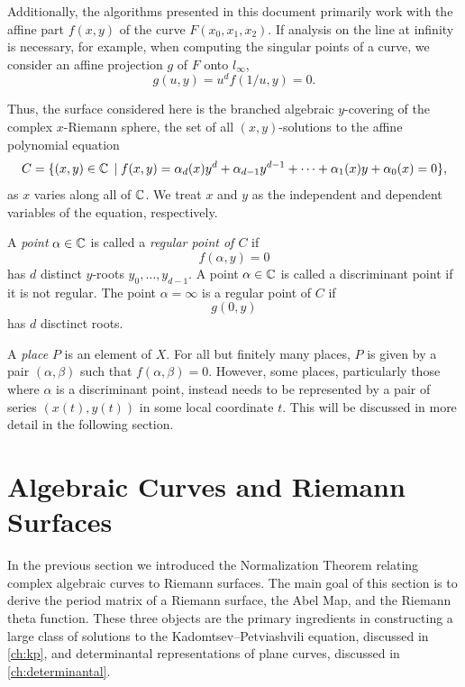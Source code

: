 Additionally, the algorithms presented in this document primarily work with the
affine part $f(x,y)$ of the curve $F(x_0,x_1,x_2)$. If analysis on the line at
infinity is necessary, for example, when computing the singular points of a
curve, we consider an affine projection $g$ of $F$ onto $l_\infty$,
\[
  g(u,y) = u^d f(1/u,y) = 0.
\]

Thus, the surface considered here is the branched algebraic $y$-covering of the
complex $x$-Riemann sphere, the set of all $(x,y)$-solutions to the affine
polynomial equation
\[
    C = \{ (x,y) \in \operatorname{\mathbb{C}} \; | \; f(x,y) = \alpha_d(x)y^d +
    \alpha_{d-1}y^{d-1} + \cdots + \alpha_1(x)y + \alpha_0(x) = 0\},
\]
as $x$ varies along all of $\operatorname{\mathbb{C}}$. We treat $x$ and $y$ as the independent and
dependent variables of the equation, respectively.

A {\it point} $\alpha \in \operatorname{\mathbb{C}}$ is called a {\it regular point of $C$} if
\[
  f(\alpha,y) = 0
\]
has $d$ distinct $y$-roots $y_0,\ldots,y_{d-1}$. A point $\alpha \in \operatorname{\mathbb{C}}$ is
called a discriminant point if it is not regular. The point $\alpha = \infty$ is
a regular point of $C$ if
\[
  g(0,y)
\]
has $d$ disctinct roots.

A {\it place} $P$ is an element of $X$. For all but finitely many places, $P$ is
given by a pair $(\alpha,\beta)$ such that $f(\alpha,\beta) = 0$. However, some
places, particularly those where $\alpha$ is a discriminant point, instead needs
to be represented by a pair of series $(x(t),y(t))$ in some local coordinate
$t$. This will be discussed in more detail in the following section.


\section{Algebraic Curves and Riemann
  Surfaces}\label{sec:background-algebraic-curves-and-riemann-surfaces}

In the previous section we introduced the Normalization Theorem relating complex
algebraic curves to Riemann surfaces. The main goal of this section is to derive
the period matrix of a Riemann surface, the Abel Map, and the Riemann theta
function. These three objects are the primary ingredients in constructing a
large class of solutions to the Kadomtsev--Petviashvili equation, discussed in
\autoref{ch:kp}, and determinantal representations of plane curves, discussed in
\autoref{ch:determinantal}.

